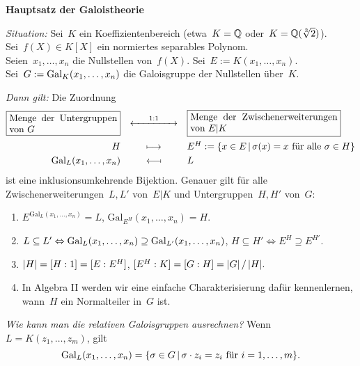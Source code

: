 \documentclass{../../algblatt}
\newcommand{\fmini}[2]{\framebox{\begin{minipage}{#1}#2\end{minipage}}}
\begin{document}
\begin{center}\Large \sffamily\textbf{Hauptsatz der Galoistheorie}\end{center}

\emph{Situation:} \tabto{1.85cm}
Sei~$K$ ein Koeffizientenbereich (etwa~$K = \mathbb{Q}$ oder~$K = \mathbb{Q}(\sqrt[3]{2})$).
\\
\tabto{1.85cm} Sei~$f(X) \in K[X]$ ein normiertes separables Polynom. \\
\tabto{1.85cm} Seien~$x_1,\ldots,x_n$ die Nullstellen von~$f(X)$.
Sei~$E := K(x_1,\ldots,x_n)$. \\
\tabto{1.85cm} Sei~$G := \mathrm{Gal}_K(x_1,\ldots,x_n)$ die Galoisgruppe der
Nullstellen über~$K$.

\emph{Dann gilt:} \tabto{1.85cm} Die Zuordnung
\[
  \begin{array}{@{}rcl@{}}
    \fmini{0.33\textwidth}{Menge der Untergruppen von~$G$}
    &\xleftrightarrow{\text{\qquad1:1\qquad}}&
    \fmini{0.45\textwidth}{Menge der Zwischenerweiterungen von~$E|K$} \\[1.3em]
    H &\longmapsto&
      E^H := \{ x \in E \,|\, \text{$\sigma(x) = x$ für alle~$\sigma \in H$} \} \\[0.3em]
    \mathrm{Gal}_L(x_1,\ldots,x_n) &\longmapsfrom& L
  \end{array}
\]
ist eine inklusionsumkehrende Bijektion.
Genauer gilt für alle Zwischenerweiterungen~$L,L'$ von~$E|K$
und Untergruppen~$H,H'$ von~$G$:
\begin{enumerate}
\item $E^{\mathrm{Gal}_L(x_1,\ldots,x_n)} = L$,
\tabto{9cm}$\mathrm{Gal}_{E^H}(x_1,\ldots,x_n) = H$.

\item $L \subseteq L' \Leftrightarrow \mathrm{Gal}_L(x_1,\ldots,x_n)
\supseteq \mathrm{Gal}_{L'}(x_1,\ldots,x_n)$,
\tabto{9cm}$H \subseteq H' \Leftrightarrow E^H \supseteq E^{H'}$.

\item $|H| = [H:1] = [E:E^H]$,
\tabto{9cm}$[E^H:K] = [G:H] = |G| \mathop{/} |H|.$

\item In Algebra II werden wir eine einfache Charakterisierung dafür
kennenlernen, wann~$H$ ein Normalteiler in~$G$ ist.
\end{enumerate}

\emph{Wie kann man die relativen Galoisgruppen ausrechnen?}
Wenn~$L = K(z_1,\ldots,z_m)$, gilt
\[ \mathrm{Gal}_L(x_1,\ldots,x_n) = \{ \sigma \in G \,|\,
  \text{$\sigma \cdot z_i = z_i$ für~$i = 1,\ldots,m$} \}. \]
\end{document}
